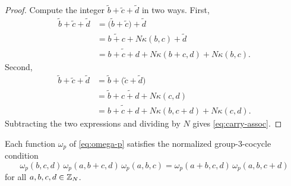 \begin{proof}
Compute the integer $\widetilde{b}+\widetilde{c}+\widetilde{d}$ in two ways. First,
\begin{align*}
\widetilde{b}+\widetilde{c}+\widetilde{d}
&=
\bigl(\widetilde{b}+\widetilde{c}\bigr)+\widetilde{d} \\
&=
\widetilde{b+c}+N\kappa(b,c)+\widetilde{d} \\
&=
\widetilde{b+c+d}+N\kappa(b+c,d)+N\kappa(b,c).
\end{align*}
Second,
\begin{align*}
\widetilde{b}+\widetilde{c}+\widetilde{d}
&=
\widetilde{b}+\bigl(\widetilde{c}+\widetilde{d}\bigr) \\
&=
\widetilde{b}+\widetilde{c+d}+N\kappa(c,d) \\
&=
\widetilde{b+c+d}+N\kappa(b,c+d)+N\kappa(c,d).
\end{align*}
Subtracting the two expressions and dividing by $N$ gives \eqref{eq:carry-assoc}.
\end{proof}

\begin{proposition}\label{prop:omega-p-cocycle}
Each function $\omega_p$ of \eqref{eq:omega-p} satisfies the normalized group-$3$-cocycle condition
\begin{equation}\label{eq:group-3-cocycle}
\omega_p(b,c,d)\,
\omega_p(a,b+c,d)\,
\omega_p(a,b,c)
=
\omega_p(a+b,c,d)\,
\omega_p(a,b,c+d)
\end{equation}
for all $a,b,c,d\in \mathbb{Z}_N$.
\end{proposition}

